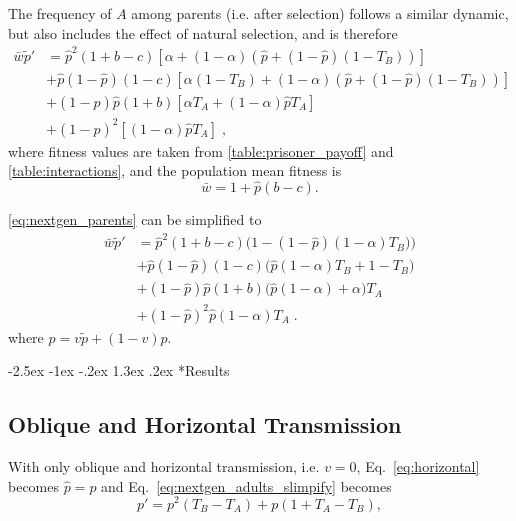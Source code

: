 \documentclass[12pt]{extarticle}
\makeatletter
\renewcommand\section{\@startsection {section}{1}{\z@}%
     {-2.5ex \@plus -1ex \@minus -.2ex}%
     {1.3ex \@plus.2ex}%
    {\Large\bfseries}}
\makeatother
\begin{document}
The frequency of $A$ among parents (i.e. after selection) follows a similar dynamic, but also includes the effect of natural selection, and is therefore
\begin{equation}\label{eq:nextgen_parents}
\begin{aligned}
\bar{w} \tilde{p}'
& = \hat{p}^2 (1+b-c) [\alpha + (1-\alpha)(\hat{p} + (1-\hat{p})(1-T_B))] \\
& + \hat{p}(1-\hat{p}) (1-c) [\alpha(1-T_B) + (1-\alpha)(\hat{p} + (1-\hat{p})(1-T_B))] \\
& + (1-\hat{p})\hat{p} (1+b) [\alpha T_A + (1-\alpha) \hat{p} T_A ] \\
& + (1-\hat{p})^2 [(1-\alpha) \hat{p} T_A] \;,
\end{aligned}
\end{equation}
where fitness values are taken from \autoref{table:prisoner_payoff} and \autoref{table:interactions}, and the population mean fitness is
\begin{equation} \label{eq:mean_fitness}
\bar{w} =  1 + \hat{p}(b-c).
\end{equation}

\autoref{eq:nextgen_parents} can be simplified to
\begin{equation}\label{eq:nextgen_parents_simplified}
\begin{aligned}
\bar{w} \tilde{p}'
& = \hat{p}^2 (1+b-c) \big(1-(1-\hat{p})(1-\alpha)T_B)\big) \\
& + \hat{p}(1-\hat{p}) (1-c) \big(\hat{p}(1-\alpha)T_B+1-T_B\big) \\
& + (1-\hat{p})\hat{p} (1+b) \big(\hat{p}(1-\alpha) + \alpha\big) T_A \\
& + (1-\hat{p})^2 \hat{p} (1-\alpha) T_A \;.
\end{aligned}
\end{equation}
where $\hat{p}=v\tilde{p}+(1-v)p$.


\section*{Results}


\subsection*{Oblique and Horizontal Transmission}

With only oblique and horizontal transmission, i.e. $v = 0$, Eq.\ \ref{eq:horizontal} becomes $\hat{p}=p$ and Eq.\ \ref{eq:nextgen_adults_slimpify} becomes %
\begin{equation}  \label{eq:nextgen_parents_oblique_only}
p' = p^2 (T_B-T_A) + p (1+T_A-T_B) ,
\end{equation}
\end{document}
